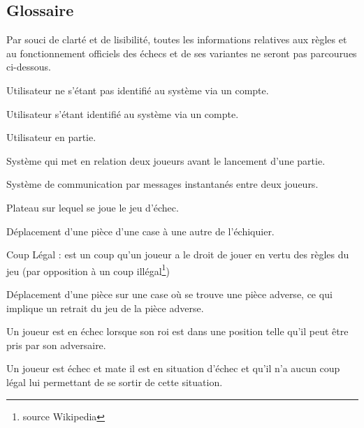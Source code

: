 \documentclass[10pt, a4paper]{article}
\begin{document}
		\subsection{Glossaire} Par souci de clarté et de lisibilité, toutes les informations relatives aux règles et au fonctionnement officiels des échecs et de ses variantes ne seront pas parcourues ci-dessous.
		\begin{description}
		\item[Un utilisateur non-enregistré :] Utilisateur ne s'étant pas identifié au système via un compte.
		\item[Un utilisateur enregistré :] Utilisateur s'étant identifié au système via un compte.
		\item[Joueur :] Utilisateur en partie.
		\item[Matchmaking :] Système qui met en relation deux joueurs avant le lancement d'une partie.
		\item[Chat :] Système de communication par messages instantanés entre deux joueurs.
		\item[Echiquier (Board) :] Plateau sur lequel se joue le jeu d'échec.
		\item[Coup/Mouvement :] Déplacement d'une pièce d'une case à une autre de l'échiquier.
		\item{Coup Légal :} est un coup qu'un joueur a le droit de jouer en vertu des règles du jeu (par opposition à un coup illégal\footnote{source Wikipedia})
		\item[Prise :] Déplacement d'une pièce sur une case où se trouve une pièce adverse, ce qui implique un retrait du jeu de la pièce adverse.
		\item[Echec :] Un joueur est en échec lorsque son roi est dans une position telle qu'il peut être pris par son adversaire.
		\item[Echec et mat :] Un joueur est échec et mate il est en situation d'échec et qu'il n'a aucun coup légal lui permettant de se sortir de cette situation.

\end{description}
\end{document}
